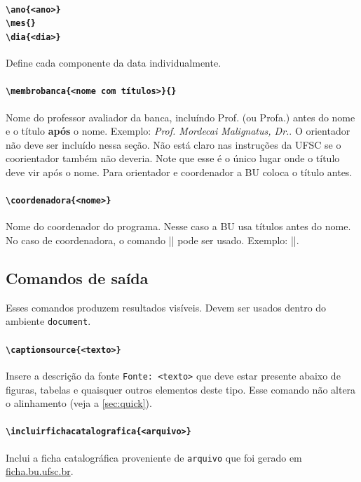 \documentclass[embeddedlogo]{../ufsc-thesis-rn46-2019}
\begin{document}
\paragraph*{\texttt{\textbackslash{}ano\{<ano>\}} \\
            \texttt{\textbackslash{}mes\{<nome do mes>\}} \\
            \texttt{\textbackslash{}dia\{<dia>\}}}
Define cada componente da data individualmente.

\paragraph*{\texttt{\textbackslash{}membrobanca\{<nome com
títulos>\}\{<universidade por extenso>\}}}
Nome do professor avaliador da banca, incluíndo Prof. (ou Profa.) antes do
nome e o título \textbf{após} o nome. Exemplo: \emph{Prof. Mordecai
Malignatus, Dr.}. O orientador não deve ser incluído nessa seção. Não está
claro nas instruções da UFSC se o coorientador também não deveria. Note que
esse é o único lugar onde o título deve vir após o nome. Para orientador e
coordenador a BU coloca o título antes.

\paragraph*{\texttt{\textbackslash{}coordenadora\{<nome>\}}} Nome do
coordenador do programa. Nesse caso a BU usa títulos antes do nome. No caso de
coordenadora, o comando \mt|\coordenadora| pode ser usado. Exemplo:
\mt||.

\subsection{Comandos de saída}

Esses comandos produzem resultados visíveis. Devem ser usados dentro do
ambiente \texttt{document}.

\paragraph*{\texttt{\textbackslash{}captionsource\{<texto>\}}} Insere a
descrição da fonte \texttt{Fonte: <texto>} que deve estar presente abaixo de
figuras, tabelas e quaisquer outros elementos deste tipo. Esse comando não
altera o alinhamento (veja a \autoref{sec:quick}).

\paragraph*{\texttt{\textbackslash{}incluirfichacatalografica\{<arquivo>\}}}
Inclui a ficha catalográfica proveniente de \texttt{arquivo} que foi gerado em
\href{http://ficha.bu.ufsc.br/}{ficha.bu.ufsc.br}.
\end{document}

